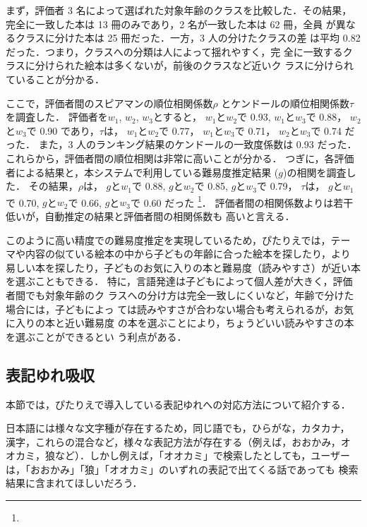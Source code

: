 \documentclass[japanese]{jnlp_1.4}
\newcommand{\changed}[1]{}
\renewcommand{\changed}[1]{}
\begin{document}
まず，評価者 3 名によって選ばれた対象年齢のクラスを比較した．その結果，
完全に一致した本は 13 冊のみであり，2 名が一致した本は 62 冊，全員
が異なるクラスに分けた本は 25 冊だった．一方，3 人の分けたクラスの差
は平均 0.82 だった．つまり，クラスへの分類は人によって揺れやすく，完
全に一致するクラスに分けられた絵本は多くないが，前後のクラスなど近いク
ラスに分けられていることが分かる．


ここで，評価者間のスピアマンの順位相関係数$\rho$
とケンドールの順位相関係数$\tau$を調査した．
評価者を$w_1$, $w_2$, $w_3$とすると，\changed{$\rho$は}
$w_1$と$w_2$で 0.93, 
$w_1$と$w_3$で 0.88，
$w_2$と$w_3$で 0.90
であり，$\tau$は，
$w_1$と$w_2$で 0.77，
$w_1$と$w_3$で 0.71，
$w_2$と$w_3$で 0.74 だった．
また，3 人のランキング結果のケンドールの一致度係数は
0.93 だった．
これらから，評価者間の順位相関は非常に高いことが分かる．
つぎに，各評価者による結果と，本システムで利用している難易度推定結果 ($g$)の相関を調査した．
その結果，$\rho$は，
$g$と$w_1$で 0.88, 
$g$と$w_2$で 0.85, 
$g$と$w_3$で 0.79，
$\tau$は，
$g$と$w_1$で 0.70,
$g$と$w_2$で 0.66,
$g$と$w_3$で 0.60 だった
\footnote{\changed{本章のすべての相関係数と一致度係数は$p<0.001$で有意だった．}}．
評価者間の相関係数よりは若干低いが，自動推定の結果と評価者間の相関係数も
高いと言える．

このように高い精度での難易度推定を実現しているため，ぴたりえでは，テー
マや内容の似ている絵本の中から子どもの年齢に合った絵本を探したり，より
易しい本を探したり，子どものお気に入りの本と難易度（読みやすさ）が近い本
を選ぶこともできる．
特に，言語発達は子どもによって個人差が大きく，評価者間でも対象年齢のク
ラスへの分け方は完全一致しにくいなど，年齢で分けた場合には，子どもによっ
ては読みやすさが合わない場合も考えられるが，お気に入りの本と近い難易度
の本を選ぶことにより，ちょうどいい読みやすさの本を選ぶことができるとい
う利点がある．



\subsection{表記ゆれ吸収}
\label{sec:yure}

本節では，ぴたりえで導入している表記ゆれへの対応方法について紹介する．


日本語には様々な文字種が存在するため，同じ語でも，ひらがな，カタカナ，
漢字，これらの混合など，様々な表記方法が存在する（例えば，おおかみ，オ
オカミ，狼など）．しかし例えば，「オオカミ」で検索したとしても，ユーザー
は，「おおかみ」「狼」「オオカミ」のいずれの表記で出てくる話であっても
検索結果に含まれてほしいだろう．
\end{document}
